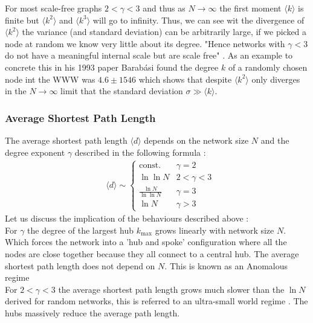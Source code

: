 \documentclass{article}
\begin{document}
                For most scale-free graphs $2<\gamma<3$ and thus as $N\to \infty$ the first moment $\langle k \rangle$ is finite but $\langle k^2 \rangle$ and $\langle k^3 \rangle$ will go to infinity. Thus, we can see wit the divergence of $\langle k^2 \rangle$ the variance (and standard deviation) can be arbitrarily large, if we picked a node at random we know very little about its degree. "Hence networks with $\gamma<3$ do not have a meaningful internal scale but are scale free" \parencite{barabasi2013network}. As an example to concrete this in his 1993 paper Barabási found the degree $k$ of a randomly chosen node int the WWW was $4.6 \pm 1546$ which shows that despite $\langle k^2 \rangle$ only diverges in the $N \to \infty$ limit that the standard deviation $\sigma \gg  \langle k \rangle$.\\
            \subsubsection{Average Shortest Path Length}
            The average shortest path length $\langle d \rangle$ depends on the network size $N$ and the degree exponent $\gamma$ described in the following formula \parencite{bollobas2004diameter}\parencite{cohen2003scale}:\\
            \begin{align*}
                &\langle d \rangle \sim
                \begin{cases}
                    \text{const.} &\gamma =2\\
                    \ln\ln N  &2<\gamma<3\\
                    \frac{\ln N}{\ln\ln N}  &\gamma = 3\\
                    \ln N  &\gamma>3
                \end{cases}
            \end{align*}
            Let us discuss the implication of the behaviours described above \parencite{barabasi2013network}:\\
            For $\gamma$ the degree of the largest hub $k_{\text{max}}$ grows linearly with network size $N$. Which forces the network into a 'hub and spoke' configuration where all the nodes are close together because they all connect to a central hub. The average shortest path length does not depend on $N$. This is known as an Anomalous regime\\
            For $2<\gamma<3$ the average shortest path length grows much slower than the $\ln N$ derived for random networks, this is referred to an ultra-small world regime \parencite{cohen2003scale}. The hubs massively reduce the average path length.\\
\end{document}
